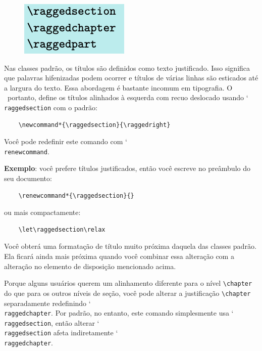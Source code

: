 \begin{figure}
    \centering
    \includegraphics[width=0.4\linewidth]{imagens/imagem22.png}
\end{figure}

\newpage

Nas classes padrão, os títulos são definidos como texto justificado. Isso significa que palavras hifenizadas podem ocorrer e títulos de várias linhas são esticados até a largura do texto. Essa abordagem é bastante incomum em tipografia. O \KOMAScript\ portanto, define os títulos alinhados à esquerda com recuo deslocado usando \char`\\\texttt{ragged\-sec\-tion} com o padrão:
\begin{verbatim}
    \newcommand*{\raggedsection}{\raggedright}
\end{verbatim}

Você pode redefinir este comando com \char`\\\texttt{renewcommand}.

\textbf{Exemplo}: você prefere títulos justificados, então você escreve no preâmbulo do seu documento:
\begin{verbatim}
    \renewcommand*{\raggedsection}{}
\end{verbatim}
ou mais compactamente:
\begin{verbatim}
    \let\raggedsection\relax
\end{verbatim}

Você obterá uma formatação de título muito próxima daquela das classes padrão. Ela ficará ainda mais próxima quando você combinar essa alteração com a alteração no elemento de disposição mencionado acima.

Porque alguns usuários querem um alinhamento diferente para o nível \verb|\chapter| do que para os outros níveis de seção, você pode alterar a justificação \verb|\chapter| separadamente redefinindo \char`\\\texttt{rag\-ged\-chap\-ter}. Por padrão, no entanto, este comando simplesmente usa \char`\\\texttt{rag\-ged\-sec\-tion}, então alterar \char`\\\texttt{rag\-ged\-sec\-tion} afeta indiretamente \char`\\\texttt{rag\-ged\-chap\-ter}.

